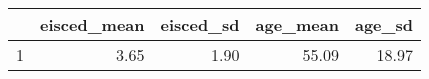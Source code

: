 \begin{table}[ht]
\centering
\begin{tabular}{rrrrr}
  \hline
 & eisced\_mean & eisced\_sd & age\_mean & age\_sd \\ 
  \hline
1 & 3.65 & 1.90 & 55.09 & 18.97 \\ 
   \hline
\end{tabular}
\end{table}
